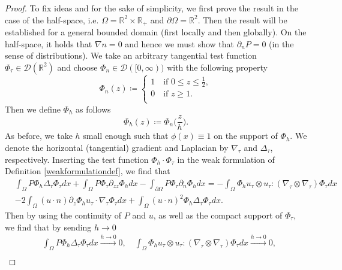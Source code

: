 \documentclass[12pt,a4paper]{article}
\theoremstyle{definition}
\theoremstyle{remark}
\numberwithin{equation}{section}
\begin{document}
\begin{proof}
To fix ideas and for the sake of simplicity, we first prove the result in the case of the half-space, i.e. $\Omega = \mathbb{R}^2 \times \mathbb{R}_+$ and $\partial \Omega = \mathbb{R}^2$. Then the result will be established for a general bounded domain (first locally and then globally). On the half-space, it holds that $\nabla n = 0$ and hence we must show that $\partial_n P = 0$ (in the sense of distributions). We take an arbitrary tangential test function $\Phi_\tau \in \mathcal{D} (\mathbb{R}^2)$ and choose $\Phi_n \in \mathcal{D} ([0, \infty) )$ with the following property
\begin{equation}
\Phi_n (z) \coloneqq \begin{cases}
1 \quad \text{if } 0 \leq z \leq \frac{1}{2}, \\
0 \quad \text{if } z \geq 1. \\
\end{cases}
\end{equation}
Then we define $\Phi_h$ as follows
\begin{equation} \label{Phihdefinition}
\Phi_h (z) \coloneqq \Phi_n \bigg( \frac{z}{h} \bigg).
\end{equation}
As before, we take $h$ small enough such that $\phi (x) \equiv 1$ on the support of $\Phi_h$. We denote the horizontal (tangential) gradient and Laplacian by $\nabla_\tau$ and $\Delta_\tau$, respectively. Inserting the test function $\Phi_h \cdot \Phi_\tau$ in the weak formulation of Definition \ref{weakformulationdef}, we find that
\begin{align}
&\int_\Omega P \Phi_h \Delta_\tau \Phi_\tau dx + \int_\Omega P \Phi_\tau \partial_{zz} \Phi_h dx - \int_{\partial \Omega} P \Phi_\tau \partial_n \Phi_h dx  = - \int_\Omega \Phi_h u_\tau \otimes u_\tau : (\nabla_\tau \otimes \nabla_\tau) \Phi_\tau  dx \nonumber \\
&- 2 \int_\Omega (u \cdot n) \partial_z \Phi_h u_\tau \cdot \nabla_\tau \Phi_\tau  dx + \int_\Omega (u \cdot n)^2 \Phi_h \Delta_\tau \Phi_\tau dx. \label{halfspacequation}
\end{align}
Then by using the continuity of $P$ and $u$, as well as the compact support of $\Phi_\tau$, we find that by sending $h \rightarrow 0$
\begin{align*}
&\int_\Omega P \Phi_h \Delta_\tau \Phi_\tau dx \xrightarrow[]{h \rightarrow 0} 0, \quad \int_\Omega \Phi_h u_\tau \otimes u_\tau : (\nabla_\tau \otimes \nabla_\tau) \Phi_\tau  dx \xrightarrow[]{h \rightarrow 0} 0, \\

\end{align*}
\end{proof}
\end{document}
